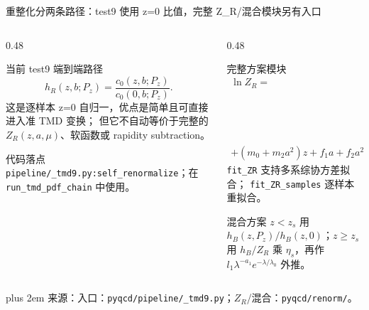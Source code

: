 \documentclass[UTF8,aspectratio=169,11pt]{ctexbeamer}
\newcommand{\source}[1]{%
  \par\vspace{0.02em}\begingroup\fontsize{6}{6.8}\selectfont\raggedright\sloppy
  \setlength{\emergencystretch}{3em}\rightskip=0pt plus 2em
  \color{muted}来源：#1\par\endgroup}
\begin{document}
\begin{frame}[t]{重整化分两条路径：test9 使用 z=0 比值，完整 Z\_R/混合模块另有入口}
  \begin{columns}[T,totalwidth=\textwidth]
    \begin{column}{0.48\textwidth}
      \scriptsize
      \begin{block}{当前 test9 端到端路径}
        \begin{equation*}
          h_R(z,b;P_z)=\frac{c_0(z,b;P_z)}{c_0(0,b;P_z)}.
        \end{equation*}
        这是逐样本 z=0 自归一，优点是简单且可直接进入准 TMD 变换；
        但它不自动等价于完整的 \(Z_R(z,a,\mu)\)、软函数或 rapidity subtraction。
      \end{block}
      \begin{block}{代码落点}
        \nolinkurl{pipeline/_tmd9.py:self_renormalize}；在
        \nolinkurl{run_tmd_pdf_chain} 中使用。
      \end{block}
    \end{column}
    \begin{column}{0.48\textwidth}
      \scriptsize
      \begin{block}{完整方案模块}
        \begin{align*}
          \ln Z_R={}&k\frac{z}{a\ln(a\Lambda)}\\[-0.2em]
          &+\frac12\ln\left(1+\frac{d}{\ln(a\Lambda)}\right)^2\\[-0.2em]
          &+\frac{5C_A}{3b_0}
          \ln\frac{\ln(1/a\Lambda)}{\ln(\mu/\Lambda)}\\[-0.2em]
          +(m_0+m_2a^2)z+f_1a+f_2a^2.
        \end{align*}
        \nolinkurl{fit_ZR} 支持多系综协方差拟合；
        \nolinkurl{fit_ZR_samples} 逐样本重拟合。
      \end{block}
      \begin{block}{混合方案}
        \(z<z_s\) 用 \(h_B(z,P_z)/h_B(z,0)\)；\(z\ge z_s\) 用
        \(h_B/Z_R\) 乘 \(\eta_s\)，再作 \(l_1\lambda^{-a_1}e^{-\lambda/\lambda_0}\) 外推。
      \end{block}
    \end{column}
  \end{columns}
  \vspace{-0.08em}
  \source{入口：\nolinkurl{pyqcd/pipeline/_tmd9.py}；\(Z_R\)/混合：\nolinkurl{pyqcd/renorm/}。}
\end{frame}
\end{document}
